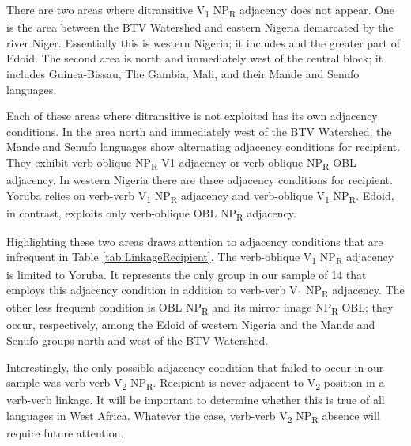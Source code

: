 \documentclass[output=paper,colorlinks,citecolor=brown]{langscibook}
\begin{document}
There are two areas where ditransitive V\textsubscript{1} NP\textsubscript{R} adjacency does not appear. One is the area between the BTV Watershed and eastern Nigeria demarcated by the river Niger. Essentially this is western Nigeria; it includes  and the greater part of   Edoid. The second area is north and immediately west of the central block; it includes Guinea-Bissau, The Gambia, Mali, and their Mande and Senufo languages.

Each of these areas where ditransitive is not exploited has its own adjacency conditions. In the area north and immediately west of the BTV Watershed, the Mande and Senufo languages show alternating adjacency conditions for recipient. They exhibit verb-oblique NP\textsubscript{R} V1 adjacency or verb-oblique NP\textsubscript{R} OBL adjacency. In western Nigeria there are three adjacency conditions for recipient. Yoruba relies on verb-verb V\textsubscript{1} NP\textsubscript{R} adjacency and verb-oblique V\textsubscript{1} NP\textsubscript{R}. Edoid, in contrast, exploits only verb-oblique OBL NP\textsubscript{R} adjacency.

Highlighting these two areas draws attention to adjacency conditions that are infrequent in Table \ref{tab:LinkageRecipient}. The verb-oblique V\textsubscript{1} NP\textsubscript{R} adjacency is limited to Yoruba. It represents the only group in our sample of 14 that employs this adjacency condition in addition to verb-verb V\textsubscript{1} NP\textsubscript{R} adjacency. The other less frequent condition is OBL NP\textsubscript{R} and its mirror image NP\textsubscript{R} OBL; they occur, respectively, among the Edoid of western Nigeria and the Mande and Senufo groups north and west of the BTV Watershed.

Interestingly, the only possible adjacency condition that failed to occur in our sample was verb-verb V\textsubscript{2} NP\textsubscript{R}. Recipient is never adjacent to V\textsubscript{2} position in a verb-verb linkage. It will be important to determine whether this is true of all languages in West Africa. Whatever the case, verb-verb V\textsubscript{2} NP\textsubscript{R} absence will require future attention.
\end{document}
